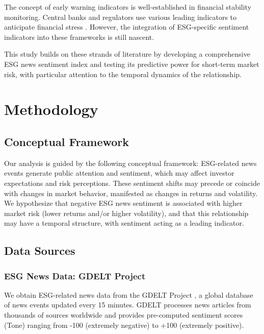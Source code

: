 \documentclass[12pt,a4paper]{article}
\begin{document}
The concept of early warning indicators is well-established in financial stability monitoring. Central banks and regulators use various leading indicators to anticipate financial stress \citep{ngfs2019call}. However, the integration of ESG-specific sentiment indicators into these frameworks is still nascent.

This study builds on these strands of literature by developing a comprehensive ESG news sentiment index and testing its predictive power for short-term market risk, with particular attention to the temporal dynamics of the relationship.


\section{Methodology}
\label{sec:methodology}

\subsection{Conceptual Framework}
\label{subsec:framework}

Our analysis is guided by the following conceptual framework: ESG-related news events generate public attention and sentiment, which may affect investor expectations and risk perceptions. These sentiment shifts may precede or coincide with changes in market behavior, manifested as changes in returns and volatility. We hypothesize that negative ESG news sentiment is associated with higher market risk (lower returns and/or higher volatility), and that this relationship may have a temporal structure, with sentiment acting as a leading indicator.


\subsection{Data Sources}
\label{subsec:data-sources}

\subsubsection{ESG News Data: GDELT Project}
\label{subsubsec:gdelt}

We obtain ESG-related news data from the GDELT Project \citep{leetaru2013gdelt}, a global database of news events updated every 15 minutes. GDELT processes news articles from thousands of sources worldwide and provides pre-computed sentiment scores (Tone) ranging from -100 (extremely negative) to +100 (extremely positive).
\end{document}
